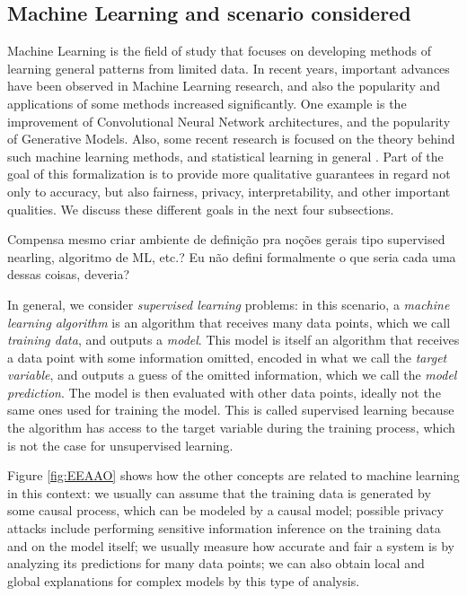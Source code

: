 \subsection{Machine Learning and scenario considered}


Machine Learning is the field of study that focuses on developing methods of learning general patterns from limited data. In recent years, important advances have been observed in Machine Learning research, and also the popularity and applications of some methods increased significantly. One example is the improvement of Convolutional Neural Network architectures, and the popularity of Generative Models. Also, some recent research is focused on the theory behind such machine learning methods\cite{SAAMAP}\cite{grohs2022mathematical}, and statistical learning in general \cite{Vapnik}. Part of the goal of this formalization is to provide more qualitative guarantees in regard not only to accuracy, but also fairness, privacy, interpretability, and other important qualities. We discuss these different goals in the next four subsections.

{\color{orange} Compensa mesmo criar ambiente de definição pra noções gerais tipo supervised nearling, algoritmo de ML, etc.? Eu não defini formalmente o que seria cada uma dessas coisas, deveria?}

In general, we consider \emph{supervised learning} problems: in this scenario, a \emph{machine learning algorithm} is an algorithm that receives many data points, which we call \emph{training data}, and outputs a \emph{model}. This model is itself an algorithm that receives a data point with some information omitted, encoded in what we call the \emph{target variable}, and outputs a guess of the omitted information, which we call the \emph{model prediction}. The model is then evaluated with other data points, ideally not the same ones used for training the model. This is called supervised learning because the algorithm has access to the target variable during the training process, which is not the case for unsupervised learning.

Figure \ref{fig:EEAAO} shows how the other concepts are related to machine learning in this context: we usually can assume that the training data is generated by some causal process, which can be modeled by a causal model; possible privacy attacks include performing sensitive information inference on the training data and on the model itself; we usually measure how accurate and fair a system is by analyzing its predictions for many data points; we can also obtain local and global explanations for complex models by this type of analysis.

